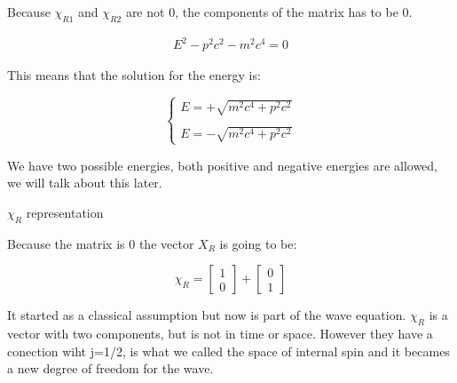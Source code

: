 Because $\chi_{R1}$ and $\chi_{R2}$ are not 0, the components of the matrix has to be 0.

\begin{equation}
  \label{10.54}
  \begin{array}{c}
    E^2 - p^2c^2 -m^2c^4 = 0
  \end{array}
\end{equation}

This means that the solution for the energy is:

\begin{equation}
  \left\{
  \begin{array}{l}
    E = + \sqrt{m^2c^4 + p^2c^2}
    \\

    \\
    E = - \sqrt{m^2c^4 + p^2c^2}
  \end{array}
  \right.
\end{equation}

We have two possible energies, both positive and negative energies are allowed, we will talk about this later.

\begin{marginfigure}
  \caption{$\chi_R$ representation}
\end{marginfigure}

Because the matrix is 0 the vector $X_R$ is going to be:

\begin{equation}
  \chi_R = \begin{bmatrix}
    1\\
    0
  \end{bmatrix} + \begin{bmatrix}
    0\\
    1
  \end{bmatrix}
\end{equation}




It started as a classical assumption but now is part of the wave equation. $\chi_R$ is a vector with two components, but is not in time or space. However they have a conection wiht j=1/2, is what we called the space of internal spin and it becames a new degree of freedom for the wave.

